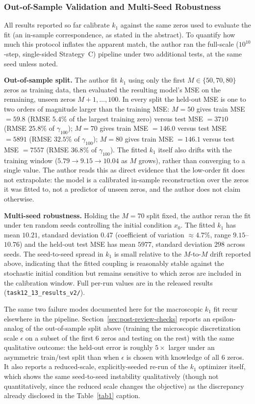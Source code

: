 \documentclass[mca,article,submit,oneauthor,pdftex]{Definitions/mdpi}
\begin{document}
\subsubsection{Out-of-Sample Validation and Multi-Seed Robustness}\label{sec:oos}

All results reported so far calibrate $k_1$ against the same zeros used
to evaluate the fit (an in-sample correspondence, as stated in the
abstract). To quantify how much this protocol inflates the apparent
match, the author ran the full-scale (\(10^{10}\)-step, single-sided
Strategy~C) pipeline under two additional tests, at the same seed unless
noted.

\textbf{Out-of-sample split.} The author fit $k_1$ using only the first
$M\in\{50,70,80\}$ zeros as training data, then evaluated the resulting
model's MSE on the remaining, unseen zeros $M{+}1,\dots,100$. In every
split the held-out MSE is one to two orders of magnitude larger than the
training MSE: $M=50$ gives train MSE $=59.8$ (RMSE $5.4\%$ of the
largest training zero) versus test MSE $=3710$ (RMSE $25.8\%$ of
$\gamma_{100}$); $M=70$ gives train MSE $=146.0$ versus test MSE $=5891$
(RMSE $32.5\%$ of $\gamma_{100}$); $M=80$ gives train MSE $=146.1$ versus
test MSE $=7557$ (RMSE $36.8\%$ of $\gamma_{100}$). The fitted $k_1$
itself also drifts with the training window ($5.79\to9.15\to10.04$ as
$M$ grows), rather than converging to a single value. The author reads this as
direct evidence that the low-order fit does not extrapolate: the model
is a calibrated in-sample reconstruction over the zeros it was fitted
to, not a predictor of unseen zeros, and the author does not claim otherwise.

\textbf{Multi-seed robustness.} Holding the $M=70$ split fixed, the author
reran the fit under ten random seeds controlling the initial condition
$x_0$. The fitted $k_1$ has mean $10.21$, standard deviation $0.47$
(coefficient of variation $\approx4.7\%$, range $9.15$--$10.76$) and the
held-out test MSE has mean $5977$, standard deviation $298$ across
seeds. The seed-to-seed spread in $k_1$ is small relative to the
$M$-to-$M$ drift reported above, indicating that the fitted coupling is
reasonably stable against the stochastic initial condition but remains
sensitive to which zeros are included in the calibration window. Full
per-run values are in the released results
(\texttt{task12\_13\_results\_v2/}).

The same two failure modes documented here for the macroscopic $k_1$ fit
recur elsewhere in the pipeline. Section~\ref{sec:post-review-checks}
reports an epsilon-analog of the out-of-sample split above (training the
microscopic discretization scale $\epsilon$ on a subset of the first 6
zeros and testing on the rest) with the same qualitative outcome: the
held-out error is roughly $5\times$ larger under an asymmetric train/test
split than when $\epsilon$ is chosen with knowledge of all 6 zeros. It
also reports a reduced-scale, explicitly-seeded re-run of the $k_1$
optimizer itself, which shows the same seed-to-seed instability
qualitatively (though not quantitatively, since the reduced scale changes
the objective) as the discrepancy already disclosed in the
Table~\ref{tab1} caption.
\end{document}
